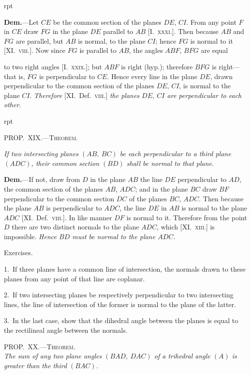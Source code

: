 \documentclass[oneside]{book}
\newcounter{wrapwidth}
\newcommand\myprop[2]{
\bigskip\Needspace*{4\baselineskip}\begin{center}\textsc{#1}\\\medskip\emph{#2}\par\end{center}
}
\newcommand\mypropflot[5]{
\vspace{0.5\baselineskip}
\bigskip\Needspace*{4\baselineskip}
\setcounter{wrapwidth}{#3}
\begin{wrapfigure}[#4]{r}{\value{wrapwidth}pt}
\begin{center}
\vspace{-0.3in}

\end{center}
\end{wrapfigure}
\hspace{1.5\parindent}\textsc{#1}\par\medskip
\indent\emph{#2}\par\medskip
}
\newcommand\exhead[1]{
\Needspace*{5\baselineskip}\begin{center}
\textsf{#1}
\end{center}
}
\newcommand\imgflow[3]{
\setcounter{wrapwidth}{#1}

\begin{wrapfigure}[#2]{r}{\value{wrapwidth}pt}
\begin{center}
\vspace{-0.3in}

\end{center}
\end{wrapfigure}
}
\begin{document}
\imgflow{160}{9}{f232}

\textbf{Dem.}---Let $CE$ be the common section of the planes
$DE$, $CI$. From any point
$F$ in $CE$ draw $FG$ in
the plane $DE$ parallel
to $AB$ [I.~\textsc{xxxi.}]. Then
because $AB$ and $FG$ are
parallel, but $AB$ is normal,
to the plane $CI$;
hence $FG$ is normal to it
[XI\@.~\textsc{viii.}]. Now since
$FG$ is parallel to $AB$, the angles $ABF$, $BFG$ are equal

to two right angles [I.~\textsc{xxix.}]; but $ABF$ is right
(hyp.); therefore $BFG$ is right---that is, $FG$ is perpendicular
to $CE$. Hence every line in the plane $DE$,
drawn perpendicular to the common section of the
planes $DE$, $CI$, is normal to the plane $CI$. \emph{Therefore}
[XI\@.\ Def.~\textsc{viii.}] \emph{the planes $DE$, $CI$ are perpendicular to
each other.}



\mypropflot{PROP\@.~XIX\@.---Theorem.}{If two intersecting planes $(AB,\ BC)$ be each perpendicular
to a third plane $(ADC)$, their common section $(BD)$
shall be normal to that plane.}{115}{11}{f233}

\textbf{Dem.}---If not, draw from $D$ in the plane $AB$ the
line $DE$ perpendicular to $AD$,
the common section of the planes
$AB$, $ADC$; and in the plane $BC$
draw $BF$ perpendicular to the
common section $DC$ of the planes
$BC$, $ADC$. Then because the
plane $AB$ is perpendicular to
$ADC$, the line $DE$ in $AB$ is
normal to the plane $ADC$ [XI\@.\ Def.~\textsc{viii.}].
In like manner $DF$
is normal to it. Therefore from
the point $D$ there are two distinct normals to the
plane $ADC$, which [XI\@.~\textsc{xiii.}] is impossible. \emph{Hence
$BD$ must be normal to the plane $ADC$.}


\exhead{Exercises.}

\begin{footnotesize}
1.~If three planes have a common line of intersection, the normals
drawn to these planes from any point of that line are coplanar.

2.~If two intersecting planes be respectively perpendicular to
two intersecting lines, the line of intersection of the former is
normal to the plane of the latter.

3.~In the last case, show that the dihedral angle between the
planes is equal to the rectilineal angle between the normals.
\par\end{footnotesize}


\myprop{PROP\@.~XX\@.---Theorem.}{The sum of any two plane angles $(BAD,\ DAC)$ of a
trihedral angle $(A)$ is greater than the third $(BAC)$.}
\end{document}
